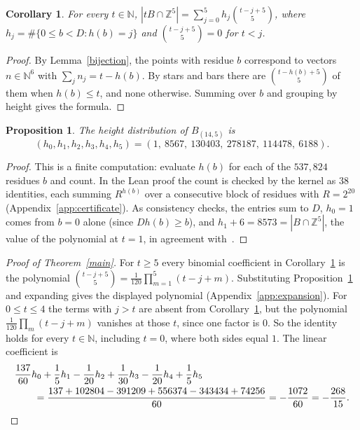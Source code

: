\documentclass[11pt]{article}
\newtheorem{proposition}[theorem]{Proposition}
\newtheorem{corollary}[theorem]{Corollary}
\theoremstyle{remark}
\newcommand{\ZZ}{\mathbb{Z}}
\newcommand{\NN}{\mathbb{N}}
\begin{document}
\begin{corollary}\label{count}
For every $t\in\NN$,
$\displaystyle |tB\cap\ZZ^5|=\sum_{j=0}^5h_j\binom{t-j+5}{5}$, where $h_j=\#\{0\le b<D:h(b)=j\}$ and $\binom{t-j+5}{5}=0$ for $t<j$.
\end{corollary}

\begin{proof}
By Lemma~\ref{bijection}, the points with residue $b$ correspond to vectors $n\in\NN^6$ with $\sum_jn_j=t-h(b)$. By stars and bars there are $\binom{t-h(b)+5}{5}$ of them when $h(b)\le t$, and none otherwise. Summing over $b$ and grouping by height gives the formula.
\end{proof}

\begin{proposition}\label{histogram}
The height distribution of $B_{(14,5)}$ is
\[
(h_0,h_1,h_2,h_3,h_4,h_5)=(1,\ 8567,\ 130403,\ 278187,\ 114478,\ 6188).
\]
\end{proposition}

\begin{proof}
This is a finite computation: evaluate $h(b)$ for each of the $537{,}824$ residues $b$ and count. In the Lean proof the count is checked by the kernel as $38$ identities, each summing $R^{h(b)}$ over a consecutive block of residues with $R=2^{20}$ (Appendix~\ref{app:certificate}). As consistency checks, the entries sum to $D$, $h_0=1$ comes from $b=0$ alone (since $Dh(b)\ge b$), and $h_1+6=8573=|B\cap\ZZ^5|$, the value of the polynomial at $t=1$, in agreement with~\cite[(1.2)]{Liu}.
\end{proof}

\begin{proof}[Proof of Theorem~\ref{main}]
For $t\ge5$ every binomial coefficient in Corollary~\ref{count} is the polynomial $\binom{t-j+5}{5}=\frac{1}{120}\prod_{m=1}^5(t-j+m)$. Substituting Proposition~\ref{histogram} and expanding gives the displayed polynomial (Appendix~\ref{app:expansion}). For $0\le t\le4$ the terms with $j>t$ are absent from Corollary~\ref{count}, but the polynomial $\frac1{120}\prod_m(t-j+m)$ vanishes at those $t$, since one factor is $0$. So the identity holds for every $t\in\NN$, including $t=0$, where both sides equal $1$. The linear coefficient is
\begin{align*}
&\frac{137}{60}h_0+\frac15h_1-\frac1{20}h_2+\frac1{30}h_3-\frac1{20}h_4+\frac15h_5\\
&\qquad=\frac{137+102804-391209+556374-343434+74256}{60}=-\frac{1072}{60}=-\frac{268}{15}. \qedhere
\end{align*}
\end{proof}
\end{document}
